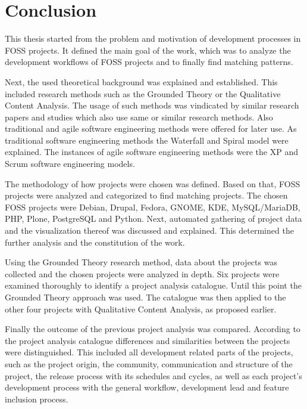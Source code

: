 \chapter{Conclusion} %
\label{chap:conclusion}

This thesis started from the problem and motivation of development processes in
\ac{FOSS} projects. It defined the main goal of the work, which was to analyze
the development workflows of \ac{FOSS} projects and to finally find matching
patterns.

Next, the used theoretical background was explained and established. This
included research methods such as the Grounded Theory or the Qualitative
Content Analysis. The usage of such methods was vindicated by similar research
papers and studies which also use same or similar research methods. Also
traditional and agile software engineering methods were offered for later use.
As traditional software engineering methods the Waterfall and Spiral model were
explained. The instances of agile software engineering methods were the
\acl{XP} and Scrum software engineering models.

The methodology of how projects were chosen was defined. Based on that,
\ac{FOSS} projects were analyzed and categorized to find matching projects.
The chosen \ac{FOSS} projects were Debian, Drupal, Fedora, GNOME, KDE,
MySQL/MariaDB, PHP, Plone, PostgreSQL and Python. Next, automated gathering of
project data and the visualization thereof was discussed and explained. This
determined the further analysis and the constitution of the work.

Using the Grounded Theory research method, data about the projects was
collected and the chosen projects were analyzed in depth. Six projects were
examined thoroughly to identify a project analysis catalogue. Until this point
the Grounded Theory approach was used. The catalogue was then applied to the
other four projects with Qualitative Content Analysis, as proposed earlier.

Finally the outcome of the previous project analysis was compared. According to
the project analysis catalogue differences and similarities between the
projects were distinguished. This included all development related parts of the
projects, such as the project origin, the community, communication and
structure of the project, the release process with its schedules and cycles, as
well as each project's development process with the general workflow,
development lead and feature inclusion process.

